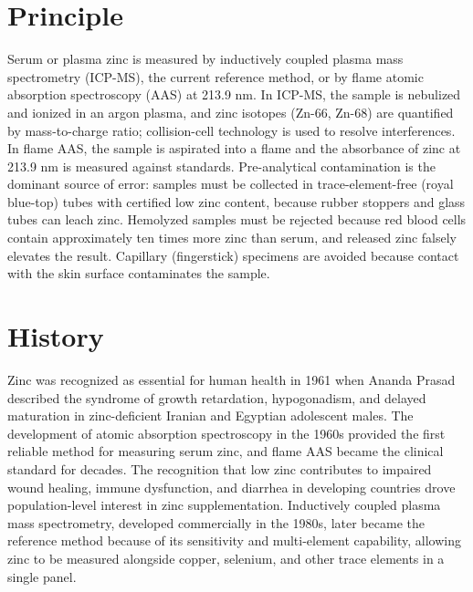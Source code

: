 \section*{Principle}
Serum or plasma zinc is measured by inductively coupled plasma mass spectrometry (ICP-MS), the current reference method, or by flame atomic absorption spectroscopy (AAS) at 213.9 nm. In ICP-MS, the sample is nebulized and ionized in an argon plasma, and zinc isotopes (Zn-66, Zn-68) are quantified by mass-to-charge ratio; collision-cell technology is used to resolve interferences. In flame AAS, the sample is aspirated into a flame and the absorbance of zinc at 213.9 nm is measured against standards. Pre-analytical contamination is the dominant source of error: samples must be collected in trace-element-free (royal blue-top) tubes with certified low zinc content, because rubber stoppers and glass tubes can leach zinc. Hemolyzed samples must be rejected because red blood cells contain approximately ten times more zinc than serum, and released zinc falsely elevates the result. Capillary (fingerstick) specimens are avoided because contact with the skin surface contaminates the sample.

\section*{History}
Zinc was recognized as essential for human health in 1961 when Ananda Prasad described the syndrome of growth retardation, hypogonadism, and delayed maturation in zinc-deficient Iranian and Egyptian adolescent males. The development of atomic absorption spectroscopy in the 1960s provided the first reliable method for measuring serum zinc, and flame AAS became the clinical standard for decades. The recognition that low zinc contributes to impaired wound healing, immune dysfunction, and diarrhea in developing countries drove population-level interest in zinc supplementation. Inductively coupled plasma mass spectrometry, developed commercially in the 1980s, later became the reference method because of its sensitivity and multi-element capability, allowing zinc to be measured alongside copper, selenium, and other trace elements in a single panel.

